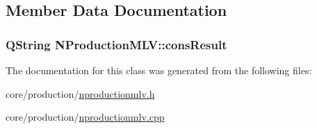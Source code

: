 \subsection{Member Data Documentation}
\hypertarget{class_n_production_m_l_v_a067380b262cd920795978b0da2786366}{
\subsubsection[{consResult}]{\setlength{\rightskip}{0pt plus 5cm}QString {\bf NProductionMLV::consResult}}}
\label{class_n_production_m_l_v_a067380b262cd920795978b0da2786366}


The documentation for this class was generated from the following files:\begin{DoxyCompactItemize}
\item 
core/production/\hyperlink{nproductionmlv_8h}{nproductionmlv.h}\item 
core/production/\hyperlink{nproductionmlv_8cpp}{nproductionmlv.cpp}\end{DoxyCompactItemize}
